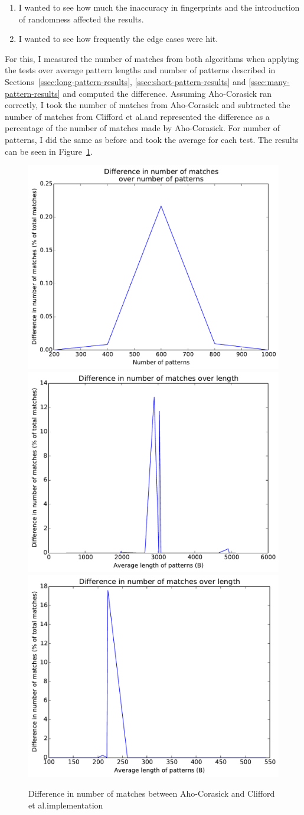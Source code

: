 \documentclass[ %
                    author={Dominic Joseph Moylett},
                    degree={MEng},
                     title={Dictionary Matching with Fingerprints},
                  subtitle={An Empirical Analysis},
                      type={research},
                      year={2015} ]{dissertation}
\begin{document}
\begin{enumerate}
  \item I wanted to see how much the inaccuracy in fingerprints and the introduction of randomness affected the results.
  \item I wanted to see how frequently the edge cases were hit.
\end{enumerate}

For this, I measured the number of matches from both algorithms when applying the tests over average pattern lengths and number of patterns described in Sections~\ref{ssec:long-pattern-results}, \ref{ssec:short-pattern-results} and \ref{ssec:many-pattern-results} and computed the difference. Assuming Aho-Corasick ran correctly, I took the number of matches from Aho-Corasick and subtracted the number of matches from Clifford et al.\@ and represented the difference as a percentage of the number of matches made by Aho-Corasick. For number of patterns, I did the same as before and took the average for each test. The results can be seen in Figure~\ref{fig:diff-results}.

\begin{figure}[t]
\begin{center}
  \includegraphics[width=0.5\linewidth]{diff_num_200_1000}\\
  \includegraphics[width=0.5\linewidth]{diff_length_1000_10000}\includegraphics[width=0.5\linewidth]{diff_length_200_1000}
\end{center}
\caption{Difference in number of matches between Aho-Corasick and Clifford et al.\@ implementation}
\label{fig:diff-results}
\end{figure}
\end{document}
